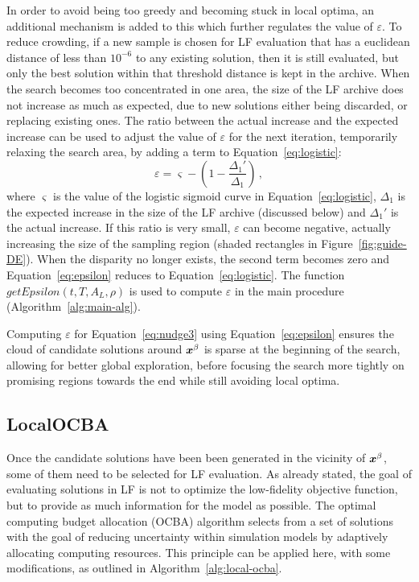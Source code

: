 In order to avoid being too greedy and becoming stuck in local optima, an additional mechanism is added to this which further regulates the value of $\varepsilon$. To reduce crowding, if a new sample is chosen for LF evaluation that has a euclidean distance of less than $10^{-6}$ to any existing solution, then it is still evaluated, but only the best solution within that threshold distance is kept in the archive. When the search becomes too concentrated in one area, the size of the LF archive does not increase as much as expected, due to new solutions either being discarded, or replacing existing ones. The ratio between the actual increase and the expected increase can be used to adjust the value of $\varepsilon$ for the next iteration, temporarily relaxing the search area, by adding a term to Equation~\ref{eq:logistic}:
\begin{equation}\label{eq:epsilon}
\varepsilon = \varsigma - \left(1 - \dfrac{\Delta_1'}{\Delta_1}\right)\,,
\end{equation}
where $\varsigma$ is the value of the logistic sigmoid curve in Equation~\ref{eq:logistic}, $\Delta_1$ is the expected increase in the size of the LF archive (discussed below) and $\Delta_1'$ is the actual increase. If this ratio is very small, $\varepsilon$ can become negative, actually increasing the size of the sampling region (shaded rectangles in Figure~\ref{fig:guide-DE}). When the disparity no longer exists, the second term becomes zero and Equation~\ref{eq:epsilon} reduces to Equation~\ref{eq:logistic}. The function $getEpsilon(t,T,A_L,\rho)$ is used to compute $\varepsilon$ in the main \AlgName{} procedure (Algorithm~\ref{alg:main-alg}). 

Computing $\varepsilon$ for Equation~\ref{eq:nudge3} using Equation~\ref{eq:epsilon} ensures the cloud of candidate solutions around $\boldsymbol{x}^\beta$ is sparse at the beginning of the search, allowing for better global exploration, before focusing the search more tightly on promising regions towards the end while still avoiding local optima.

\subsection{LocalOCBA}\label{subsec:local}
Once the candidate solutions have been been generated in the vicinity of $\boldsymbol{x}^\beta$, some of them need to be selected for LF evaluation. As already stated, the goal of evaluating solutions in LF is not to optimize the low-fidelity objective function, but to provide as much information for the model as possible. The optimal computing budget allocation (OCBA) algorithm selects from a set of solutions with the goal of reducing uncertainty within simulation models by adaptively allocating computing resources. This principle can be applied here, with some modifications, as outlined in Algorithm~\ref{alg:local-ocba}.

